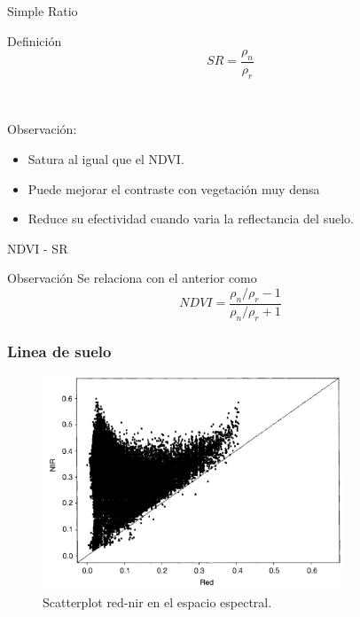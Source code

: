 \documentclass[handout]{beamer}
\begin{document}
\begin{frame}{Simple Ratio}
  \begin{block}{Definición}
    \begin{equation}
    SR=\frac{\rho_n}{\rho_r}
    \end{equation}
  \end{block}\pause\
  \begin{block}{Observación:}
      \begin{itemize}[<+->]
        \item Satura al igual que el NDVI\@.
        \item Puede mejorar el contraste con vegetación muy densa
        \item Reduce su efectividad cuando varia la reflectancia del suelo.
    \end{itemize}
  \end{block}
\end{frame}

\begin{frame}{NDVI - SR}
  \begin{block}{Observación}
    Se relaciona con el anterior como $$NDVI = \frac{\rho_n/\rho_r-1}{\rho_n/\rho_r+1}$$
  \end{block}
\end{frame}

\begin{frame}
    \frametitle{Linea de suelo}
    \begin{figure}
    \begin{center}
        \includegraphics[width=0.8\textwidth]{imagenes/scatter82.png}
    \end{center}
        \caption{Scatterplot red-nir en el espacio espectral. }
    \end{figure}
\end{frame}
\end{document}
